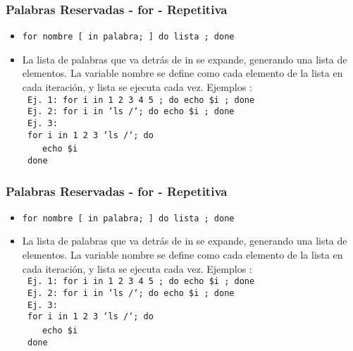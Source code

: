 \documentclass{beamer}
\begin{document}
\begin{frame}
\frametitle{Palabras Reservadas - for - Repetitiva}
 \begin{itemize}
\item \texttt{for nombre [ in palabra; ] do lista ; done}

\item La lista de palabras que va detrás de in se  expande,  generando
              una  lista  de elementos. La variable nombre se define como cada
              elemento de la lista en cada iteración, y lista se ejecuta  cada
              vez. Ejemplos :\\


\texttt{       Ej. 1: for i in 1 2 3 4 5 ; do echo \$i ; done}\\
\texttt{       Ej. 2: for i in `ls /`; do echo \$i ; done}\\
\texttt{       Ej. 3: }\\
\texttt{       for i in 1 2 3 `ls /`; do }\\ \ \ \
\texttt{           echo \$i}\\
\texttt{       done}

\end{itemize}
\end{frame}

\begin{frame}
\frametitle{Palabras Reservadas - for - Repetitiva}
 \begin{itemize}
\item \texttt{for nombre [ in palabra; ] do lista ; done}

\item La lista de palabras que va detrás de in se  expande,  generando
              una  lista  de elementos. La variable nombre se define como cada
              elemento de la lista en cada iteración, y lista se ejecuta  cada
              vez. Ejemplos :\\


\texttt{       Ej. 1: for i in 1 2 3 4 5 ; do echo \$i ; done}\\
\texttt{       Ej. 2: for i in `ls /`; do echo \$i ; done}\\
\texttt{       Ej. 3: }\\
\texttt{       for i in 1 2 3 `ls /`; do }\\ \ \ \
\texttt{           echo \$i}\\
\texttt{       done}

\end{itemize}
\end{frame}
\end{document}
